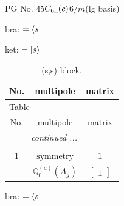 \documentclass[fleqn,8pt,landscape]{jsarticle}
\begin{document}
\setcounter{MaxMatrixCols}{32}

\renewcommand{\tablename}{Table~}
\renewcommand{\figurename}{Figure~}
\begin{center}
\LARGE
PG No. 45\quad$C_{\rm 6h}(c)$\quad$6/m$\quad[ hexagonal ] (lg basis)
\end{center}
bra: $=\bra{s}$

\noindent
ket: $=\ket{s}$
\renewcommand{\arraystretch}{1.6}
\begin{longtable}{ccc}
\caption{(s,s) block.}
 \\
 \hline \hline
No. & multipole & matrix \\ \hline \endfirsthead

\multicolumn{2}{l}{\tablename\ \thetable{}} \\
 \hline \hline
No. & multipole & matrix \\ \hline \endhead

 \hline \hline
\multicolumn{2}{r}{\footnotesize\it continued ...} \\ \endfoot

 \hline \hline
\multicolumn{2}{r}{} \\ \endlastfoot

$ 1 $ & $ \text{symmetry} $ & $ 1 $ \\
$  $ & $ \mathbb{Q}_{0}^{(a)}(A_{g}) $ & $ \begin{bmatrix} 1 \end{bmatrix} $ \\ \hline
\end{longtable}
bra: $=\bra{s}$
\end{document}
